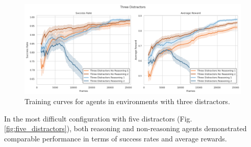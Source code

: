 \documentclass[11pt,a4paper]{article}
\begin{document}
\begin{figure}[t]
    \centering
    \includegraphics[width=\textwidth]{../images/three_distractors_training_curves.png}
    \caption{Training curves for agents in environments with three distractors.}
    \label{fig:three_distractors}
\end{figure}

In the most difficult configuration with five distractors (Fig. \ref{fig:five_distractors}), 
both reasoning and non-reasoning agents demonstrated comparable performance in terms of success rates and average rewards.
\end{document}
